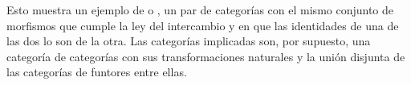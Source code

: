 
Esto muestra un ejemplo de  o ,
un par de categorías con el mismo conjunto de morfismos que cumple la ley del
intercambio y en que las identidades de una de las dos lo son de la otra. Las
categorías implicadas son, por supuesto, una categoría de categorías con sus
transformaciones naturales y la unión disjunta de las categorías de funtores
entre ellas.

